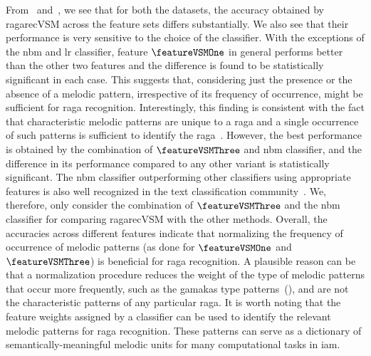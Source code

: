 From~ and~, we see that for both the datasets, the accuracy obtained by \acrshort{ragarecVSM} across the feature sets differs substantially. We also see that their performance is very sensitive to the choice of the classifier. With the exceptions of the \acrshort{nbm} and \acrshort{lr} classifier, feature $\featureVSMOne$ in general performs better than the other two features and the difference is found to be statistically significant in each case. This suggests that, considering just the presence or the absence of a melodic pattern, irrespective of its frequency of occurrence, might be sufficient for \gls{raga} recognition. Interestingly, this finding is consistent with the fact that characteristic melodic patterns are unique to a \gls{raga} and a single occurrence of such patterns is sufficient to identify the \gls{raga}~\citep{krishna2012carnatic}. However, the best performance is obtained by the combination of $\featureVSMThree$ and \acrshort{nbm} classifier, and the difference in its performance compared to any other variant is statistically significant. The \acrshort{nbm} classifier outperforming other classifiers using appropriate features is also well recognized in the text classification community~\citep{mccallum1998comparison}. We, therefore, only consider the combination of $\featureVSMThree$ and the \acrshort{nbm} classifier for comparing \acrshort{ragarecVSM} with the other methods. Overall, the accuracies across different features indicate that normalizing the frequency of occurrence of melodic patterns (as done for $\featureVSMOne$ and $\featureVSMThree$) is beneficial for \gls{raga} recognition. A plausible reason can be that a normalization procedure reduces the weight of the type of melodic patterns that occur more frequently, such as the \glspl{gamaka} type patterns~(), and are not the characteristic patterns of any particular \gls{raga}. It is worth noting that the feature weights assigned by a classifier can be used to identify the relevant melodic patterns for \gls{raga} recognition. These patterns can serve as a dictionary of semantically-meaningful melodic units for many computational tasks in \gls{iam}.

